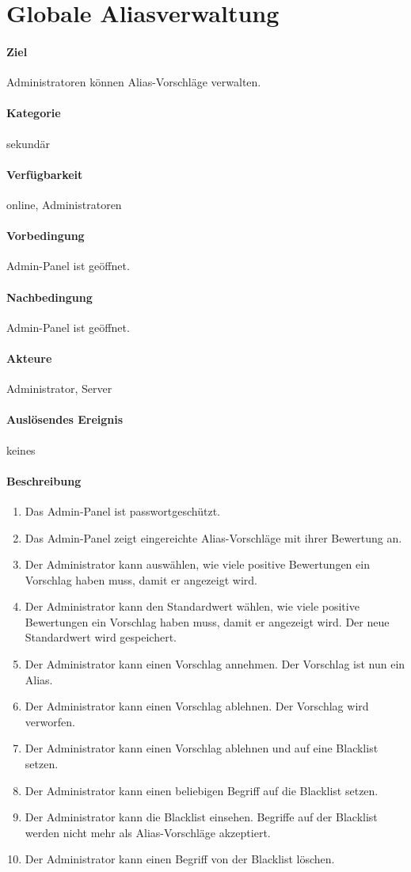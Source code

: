 \section{Globale Aliasverwaltung}
\label{Aliasverwaltungsfunktion}
\paragraph{Ziel}
Administratoren können Alias-Vorschläge verwalten.
\paragraph{Kategorie}
sekundär
\paragraph{Verfügbarkeit}
online, Administratoren
\paragraph{Vorbedingung}
Admin-Panel ist geöffnet.
\paragraph{Nachbedingung}
Admin-Panel ist geöffnet.
\paragraph{Akteure}
Administrator, Server
\paragraph{Auslösendes Ereignis}
keines
\paragraph{Beschreibung}
\begin{enumerate}
    \item Das Admin-Panel ist passwortgeschützt.
    \item Das Admin-Panel zeigt eingereichte Alias-Vorschläge mit ihrer Bewertung an.
    \item Der Administrator kann auswählen, wie viele positive Bewertungen ein Vorschlag haben muss, damit er angezeigt wird.
    \item Der Administrator kann den Standardwert wählen, wie viele positive Bewertungen ein Vorschlag haben muss, damit er angezeigt wird. Der neue Standardwert wird gespeichert.
    \item Der Administrator kann einen Vorschlag annehmen. Der Vorschlag ist nun ein Alias.
    \item Der Administrator kann einen Vorschlag ablehnen. Der Vorschlag wird verworfen.
    \item Der Administrator kann einen Vorschlag ablehnen und auf eine Blacklist setzen.
    \item Der Administrator kann einen beliebigen Begriff auf die Blacklist setzen.
    \item Der Administrator kann die Blacklist einsehen. Begriffe auf der Blacklist werden nicht mehr als Alias-Vorschläge akzeptiert.
    \item Der Administrator kann einen Begriff von der Blacklist löschen.
\end{enumerate}